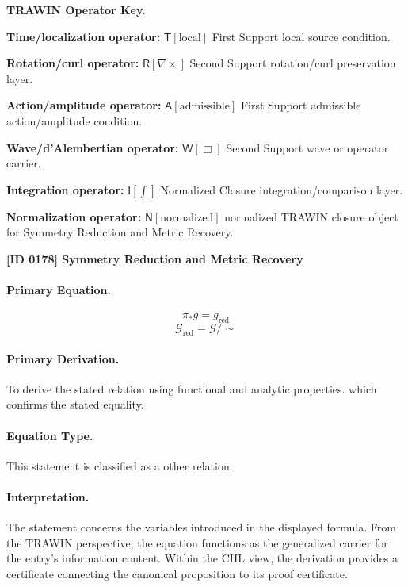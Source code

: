 \par\vspace{0.45\baselineskip}
\noindent\begin{minipage}[t]{\linewidth}
\begingroup
\small
\raggedright
\textbf{TRAWIN Operator Key.}\par
\noindent\textbf{Time/localization operator:} $\mathsf{T}\!\left[\mathrm{local}\right]$ First Support local source condition.\par
\noindent\textbf{Rotation/curl operator:} $\mathsf{R}\!\left[\nabla\times\right]$ Second Support rotation/curl preservation layer.\par
\noindent\textbf{Action/amplitude operator:} $\mathsf{A}\!\left[\mathrm{admissible}\right]$ First Support admissible action/amplitude condition.\par
\noindent\textbf{Wave/d'Alembertian operator:} $\mathsf{W}\!\left[\Box\right]$ Second Support wave or operator carrier.\par
\noindent\textbf{Integration operator:} $\mathsf{I}\!\left[\int\right]$ Normalized Closure integration/comparison layer.\par
\noindent\textbf{Normalization operator:} $\mathsf{N}\!\left[\mathrm{normalized}\right]$ normalized TRAWIN closure object for Symmetry Reduction and Metric Recovery.\par
\endgroup
\end{minipage}

\clearpage
\noindent\textbf{[ID 0178] Symmetry Reduction and Metric Recovery}\par
\vspace{0.35em}
\paragraph{Primary Equation.}
\[
\pi_* g = g_{\mathrm{red}}
\]
\[
\mathcal{G}_{\mathrm{red}} = \mathcal{G}/\!\sim
\]

\paragraph{Primary Derivation.}
To derive the stated relation using functional and analytic properties. which confirms the stated equality.
\paragraph{Equation Type.}
This statement is classified as a other relation.

\paragraph{Interpretation.}
The statement concerns the variables introduced in the displayed formula. From the TRAWIN perspective, the equation functions as the generalized carrier for the entry’s information content. Within the CHL view, the derivation provides a certificate connecting the canonical proposition to its proof certificate.

